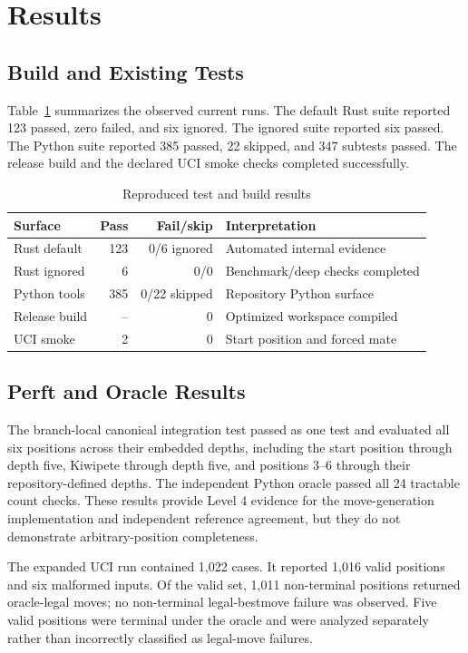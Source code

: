 \documentclass[conference]{IEEEtran}
\begin{document}
\section{Results}
\subsection{Build and Existing Tests}
Table~\ref{tab:tests} summarizes the observed current runs. The default Rust suite reported 123 passed, zero failed, and six ignored. The ignored suite reported six passed. The Python suite reported 385 passed, 22 skipped, and 347 subtests passed. The release build and the declared UCI smoke checks completed successfully.

\begin{table}[t]
\caption{Reproduced test and build results}
\label{tab:tests}
\centering
\begin{tabularx}{\columnwidth}{@{}lrrX@{}}
\toprule
Surface & Pass & Fail/skip & Interpretation \\
\midrule
Rust default & 123 & 0/6 ignored & Automated internal evidence \\
Rust ignored & 6 & 0/0 & Benchmark/deep checks completed \\
Python tools & 385 & 0/22 skipped & Repository Python surface \\
Release build & -- & 0 & Optimized workspace compiled \\
UCI smoke & 2 & 0 & Start position and forced mate \\
\bottomrule
\end{tabularx}
\end{table}

\subsection{Perft and Oracle Results}
The branch-local canonical integration test passed as one test and evaluated all six positions across their embedded depths, including the start position through depth five, Kiwipete through depth five, and positions 3--6 through their repository-defined depths. The independent Python oracle passed all 24 tractable count checks. These results provide Level 4 evidence for the move-generation implementation and independent reference agreement, but they do not demonstrate arbitrary-position completeness.

The expanded UCI run contained 1,022 cases. It reported 1,016 valid positions and six malformed inputs. Of the valid set, 1,011 non-terminal positions returned oracle-legal moves; no non-terminal legal-bestmove failure was observed. Five valid positions were terminal under the oracle and were analyzed separately rather than incorrectly classified as legal-move failures.
\end{document}
